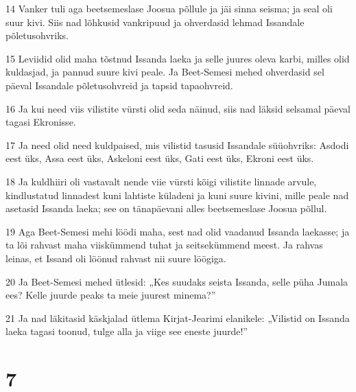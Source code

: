 \par 14 Vanker tuli aga beetsemeslase Joosua põllule ja jäi sinna seisma; ja seal oli suur kivi. Siis nad lõhkusid vankripuud ja ohverdasid lehmad Issandale põletusohvriks.
\par 15 Leviidid olid maha tõstnud Issanda laeka ja selle juures oleva karbi, milles olid kuldasjad, ja pannud suure kivi peale. Ja Beet-Semesi mehed ohverdasid sel päeval Issandale põletusohvreid ja tapsid tapaohvreid.
\par 16 Ja kui need viis vilistite vürsti olid seda näinud, siis nad läksid selsamal päeval tagasi Ekronisse.
\par 17 Ja need olid need kuldpaised, mis vilistid tasusid Issandale süüohvriks: Asdodi eest üks, Assa eest üks, Askeloni eest üks, Gati eest üks, Ekroni eest üks.
\par 18 Ja kuldhiiri oli vastavalt nende viie vürsti kõigi vilistite linnade arvule, kindlustatud linnadest kuni lahtiste küladeni ja kuni suure kivini, mille peale nad asetasid Issanda laeka; see on tänapäevani alles beetsemeslase Joosua põllul.
\par 19 Aga Beet-Semesi mehi löödi maha, sest nad olid vaadanud Issanda laekasse; ja ta lõi rahvast maha viiskümmend tuhat ja seitsekümmend meest. Ja rahvas leinas, et Issand oli löönud rahvast nii suure löögiga.
\par 20 Ja Beet-Semesi mehed ütlesid: „Kes suudaks seista Issanda, selle püha Jumala ees? Kelle juurde peaks ta meie juurest minema?”
\par 21 Ja nad läkitasid käskjalad ütlema Kirjat-Jearimi elanikele: „Vilistid on Issanda laeka tagasi toonud, tulge alla ja viige see eneste juurde!”

\chapter{7}

